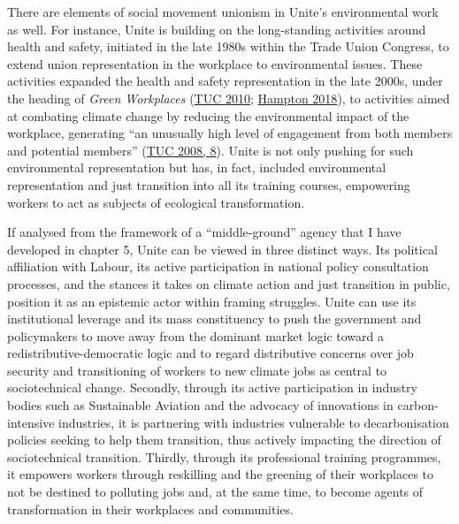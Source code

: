 \documentclass[a4paper, nobind]{templates/ociamthesis}
\begin{document}
There are elements of social movement unionism in Unite's environmental work as well. For instance, Unite is building on the long-standing activities around health and safety, initiated in the late 1980s within the Trade Union Congress, to extend union representation in the workplace to environmental issues. These activities expanded the health and safety representation in the late 2000s, under the heading of \emph{Green Workplaces} (\protect\hyperlink{ref-tuc_greening_2010}{TUC 2010}; \protect\hyperlink{ref-hampton_trade_2018}{Hampton 2018}), to activities aimed at combating climate change by reducing the environmental impact of the workplace, generating ``an unusually high level of engagement from both members and potential members'' (\protect\hyperlink{ref-tuc_green_2008}{TUC 2008, 8}). Unite is not only pushing for such environmental representation but has, in fact, included environmental representation and just transition into all its training courses, empowering workers to act as subjects of ecological transformation.

If analysed from the framework of a ``middle-ground'' agency that I have developed in chapter 5, Unite can be viewed in three distinct ways. Its political affiliation with Labour, its active participation in national policy consultation processes, and the stances it takes on climate action and just transition in public, position it as an epistemic actor within framing struggles. Unite can use its institutional leverage and its mass constituency to push the government and policymakers to move away from the dominant market logic toward a redistributive-democratic logic and to regard distributive concerns over job security and transitioning of workers to new climate jobs as central to sociotechnical change. Secondly, through its active participation in industry bodies such as Sustainable Aviation and the advocacy of innovations in carbon-intensive industries, it is partnering with industries vulnerable to decarbonisation policies seeking to help them transition, thus actively impacting the direction of sociotechnical transition. Thirdly, through its professional training programmes, it empowers workers through reskilling and the greening of their workplaces to not be destined to polluting jobs and, at the same time, to become agents of transformation in their workplaces and communities.
\end{document}
